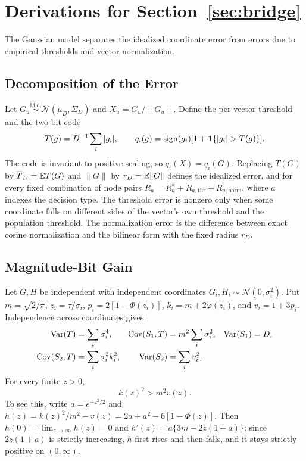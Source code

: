 \section{Derivations for Section~\ref{sec:bridge}}
\label{app:p5}

The Gaussian model separates the idealized coordinate error from errors due to empirical thresholds and vector normalization.

\subsection{Decomposition of the Error}

Let $G_u\overset{\mathrm{i.i.d.}}\sim\mathcal N(\mu_D,\Sigma_D)$ and $X_u=G_u/\|G_u\|$. Define the per-vector threshold and the two-bit code
\begin{equation}
T(g)=D^{-1}\sum_i|g_i|,\qquad q_i(g)=\sign(g_i)[1+\mathbf 1\{|g_i|>T(g)\}].
\end{equation}
The code is invariant to positive scaling, so $q_i(X)=q_i(G)$. Replacing $T(G)$ by $\overline T_D=\mathbb{E} T(G)$ and $\|G\|$ by $r_D=\mathbb{E}\|G\|$ defines the idealized error, and for every fixed combination of node pairs
$R_a=R_a^\circ+R_{a,\mathrm{thr}}+R_{a,\mathrm{norm}}$,
where $a$ indexes the decision type. The threshold error is nonzero only when some coordinate falls on different sides of the vector's own threshold and the population threshold. The normalization error is the difference between exact cosine normalization and the bilinear form with the fixed radius $r_D$.

\subsection{Magnitude-Bit Gain}

Let $G,H$ be independent with independent coordinates $G_i,H_i\sim\mathcal N(0,\sigma_i^2)$. Put $m=\sqrt{2/\pi}$, $z_i=\tau/\sigma_i$, $p_i=2[1-\Phi(z_i)]$, $k_i=m+2\varphi(z_i)$, and $v_i=1+3p_i$. Independence across coordinates gives
\begin{align}
\operatorname{Var}(T)&=\sum_i\sigma_i^4,&\operatorname{Cov}(S_1,T)&=m^2\sum_i\sigma_i^2,&\operatorname{Var}(S_1)&=D,\\
\operatorname{Cov}(S_2,T)&=\sum_i\sigma_i^2k_i^2,&\operatorname{Var}(S_2)&=\sum_iv_i^2.
\end{align}
For every finite $z>0$,
\begin{equation}
k(z)^2>m^2v(z).
\label{eq:app-magnitude-scalar}
\end{equation}
To see this, write $a=e^{-z^2/2}$ and $h(z)=k(z)^2/m^2-v(z)=2a+a^2-6[1-\Phi(z)]$. Then $h(0)=\lim_{z\to\infty}h(z)=0$ and $h'(z)=a\{3m-2z(1+a)\}$; since $2z(1+a)$ is strictly increasing, $h$ first rises and then falls, and it stays strictly positive on $(0,\infty)$.

